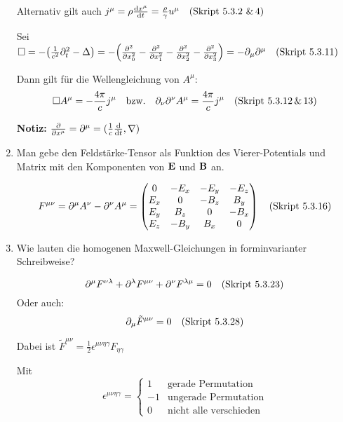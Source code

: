 \begin{enumerate}
    Alternativ gilt auch $j^\mu=\rho \dv{x^\mu}{t}
    =\frac{\rho}{\gamma}u^\mu \quad\text{(Skript 5.3.2\ \&\,4)}$

    Sei 
    $\square
    = -\qty(\frac{1}{c^2}\partial_t^2-\Delta)
    = -\qty(\pdv[2]{x_0}-\pdv[2]{x_1}-\pdv[2]{x_2}-\pdv[2]{x_3})
    = -\partial_\mu\partial^\mu \quad\text{(Skript 5.3.11)}$
    
    Dann gilt für die Wellengleichung von $A^\mu$:
    \begin{equation*}
      \square A^\mu = -\frac{4\pi}{c}j^\mu 
      \quad\text{bzw.}\quad
      \partial_\nu\partial^\nu A^\mu = \frac{4\pi}{c}j^\mu 
      \quad\text{(Skript 5.3.12\,\&\,13)}
    \end{equation*}

    \textbf{Notiz:} $\pdv{x^\mu}=\partial^\mu=(\frac{1}{c}\dv t, \nabla)$

  \item Man gebe den Feldstärke-Tensor als Funktion des %
    Vierer-Potentials
    und Matrix mit den Komponenten von $\vb E$ und $\vb B$ an.

    \begin{equation*}
      F^{\mu\nu}=\partial^\mu A^\nu - \partial^\nu A^\mu=
      \begin{pmatrix}
        0   & -E_x & -E_y & -E_z\\ 
        E_x & 0    & -B_z & B_y \\ 
        E_y & B_z  & 0    & -B_x\\ 
        E_z & -B_y & B_x  & 0   \\ 
      \end{pmatrix}
    \quad\text{(Skript 5.3.16)}
    \end{equation*}

  \clearpage
  \item Wie lauten die homogenen Maxwell-Gleichungen in forminvarianter %
    Schreibweise?

    \begin{equation*}
      \partial^\mu F^{\nu\lambda} + 
      \partial^\lambda F^{\mu\nu} + 
      \partial^\nu F^{\lambda\mu}
      =0 \quad\text{(Skript 5.3.23)}
    \end{equation*}
    Oder auch:
    \begin{equation*}
      \partial_\mu \tilde F^{\mu\nu}
      =0 \quad\text{(Skript 5.3.28)}
    \end{equation*}

    Dabei ist $\tilde F^{\mu\nu}=\frac{1}{2}
    \epsilon^{\mu\nu\eta\gamma}F_{\eta\gamma}$
    
    Mit 
    \begin{equation*}
      \epsilon^{\mu\nu\eta\gamma}=
      \begin{cases}
        1&\text{gerade Permutation}\\
        -1&\text{ungerade Permutation}\\
          0&\text{nicht alle verschieden}
      \end{cases}
    \end{equation*}


\end{enumerate}
